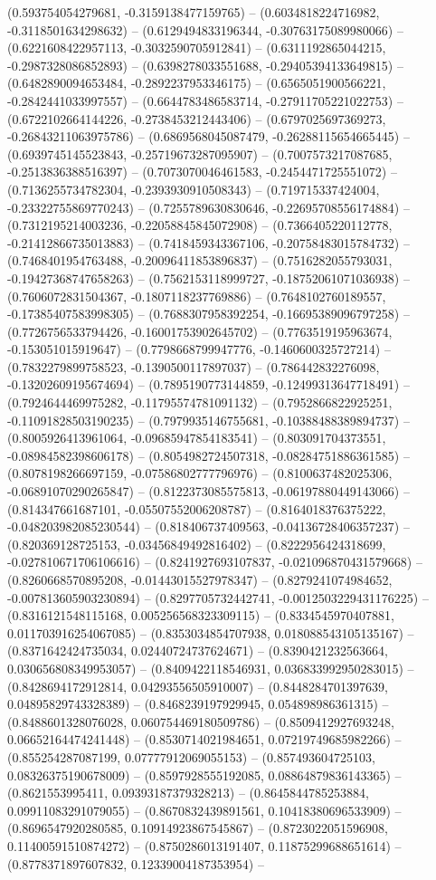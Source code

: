 (0.593754054279681, -0.3159138477159765) -- (0.6034818224716982, -0.3118501634298632) -- (0.6129494833196344, -0.30763175089980066) -- (0.6221608422957113, -0.3032590705912841) -- (0.6311192865044215, -0.2987328086852893) -- (0.6398278033551688, -0.29405394133649815) -- (0.6482890094653484, -0.2892237953346175) -- (0.6565051900566221, -0.2842441033997557) -- (0.6644783486583714, -0.27911705221022753) -- (0.6722102664144226, -0.2738453212443406) -- (0.6797025697369273, -0.26843211063975786) -- (0.6869568045087479, -0.26288115654665445) -- (0.6939745145523843, -0.25719673287095907) -- (0.7007573217087685, -0.2513836388516397) -- (0.7073070046461583, -0.2454471725551072) -- (0.7136255734782304, -0.2393930910508343) -- (0.719715337424004, -0.23322755869770243) -- (0.7255789630830646, -0.22695708556174884) -- (0.7312195214003236, -0.22058845845072908) -- (0.7366405220112778, -0.21412866735013883) -- (0.7418459343367106, -0.20758483015784732) -- (0.7468401954763488, -0.20096411853896837) -- (0.7516282055793031, -0.19427368747658263) -- (0.7562153118999727, -0.18752061071036938) -- (0.7606072831504367, -0.1807118237769886) -- (0.7648102760189557, -0.17385407583998305) -- (0.7688307958392254, -0.16695389096797258) -- (0.7726756533794426, -0.16001753902645702) -- (0.7763519195963674, -0.153051015919647) -- (0.7798668799947776, -0.1460600325727214) -- (0.7832279899758523, -0.1390500117897037) -- (0.786442832276098, -0.13202609195674694) -- (0.7895190773144859, -0.12499313647718491) -- (0.7924644469975282, -0.11795574781091132) -- (0.7952866822925251, -0.11091828503190235) -- (0.7979935146755681, -0.10388488389894737) -- (0.8005926413961064, -0.09685947854183541) -- (0.803091704373551, -0.08984582398606178) -- (0.8054982724507318, -0.08284751886361585) -- (0.8078198266697159, -0.07586802777796976) -- (0.8100637482025306, -0.06891070290265847) -- (0.8122373085575813, -0.06197880449143066) -- (0.814347661687101, -0.05507552006208787) -- (0.8164018376375222, -0.048203982085230544) -- (0.818406737409563, -0.04136728406357237) -- (0.820369128725153, -0.03456849492816402) -- (0.8222956424318699, -0.027810671706106616) -- (0.8241927693107837, -0.021096870431579668) -- (0.8260668570895208, -0.01443015527978347) -- (0.8279241074984652, -0.007813605903230894) -- (0.8297705732442741, -0.0012503229431176225) -- (0.8316121548115168, 0.005256568323309115) -- (0.8334545970407881, 0.011703916254067085) -- (0.8353034854707938, 0.018088543105135167) -- (0.8371642424735034, 0.02440724737624671) -- (0.8390421232563664, 0.030656808349953057) -- (0.8409422118546931, 0.036833992950283015) -- (0.8428694172912814, 0.04293556505910007) -- (0.8448284701397639, 0.04895829743328389) -- (0.8468239197929945, 0.054898986361315) -- (0.8488601328076028, 0.060754469180509786) -- (0.8509412927693248, 0.06652164474241448) -- (0.8530714021984651, 0.07219749685982266) -- (0.855254287087199, 0.07777912069055153) -- (0.857493604725103, 0.08326375190678009) -- (0.8597928555192085, 0.08864879836143365) -- (0.8621553995411, 0.09393187379328213) -- (0.8645844785253884, 0.09911083291079055) -- (0.8670832439891561, 0.10418380696533909) -- (0.8696547920280585, 0.10914923867545867) -- (0.8723022051596908, 0.11400591510874272) -- (0.8750286013191407, 0.11875299688651614) -- (0.8778371897607832, 0.12339004187353954) -- 